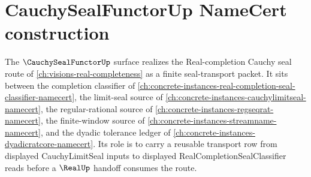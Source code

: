 \chapter{CauchySealFunctorUp NameCert construction}
\label{ch:concrete-instances-cauchy-seal-functor-namecert}

The $\CauchySealFunctorUp$ surface realizes the Real-completion Cauchy seal route of \autoref{ch:visions-real-completeness} as a finite seal-transport packet. It sits between the completion classifier of \autoref{ch:concrete-instances-real-completion-seal-classifier-namecert}, the limit-seal source of \autoref{ch:concrete-instances-cauchylimitseal-namecert}, the regular-rational source of \autoref{ch:concrete-instances-regseqrat-namecert}, the finite-window source of \autoref{ch:concrete-instances-streamname-namecert}, and the dyadic tolerance ledger of \autoref{ch:concrete-instances-dyadicratcore-namecert}. Its role is to carry a reusable transport row from displayed CauchyLimitSeal inputs to displayed RealCompletionSealClassifier reads before a $\RealUp$ handoff consumes the route.



